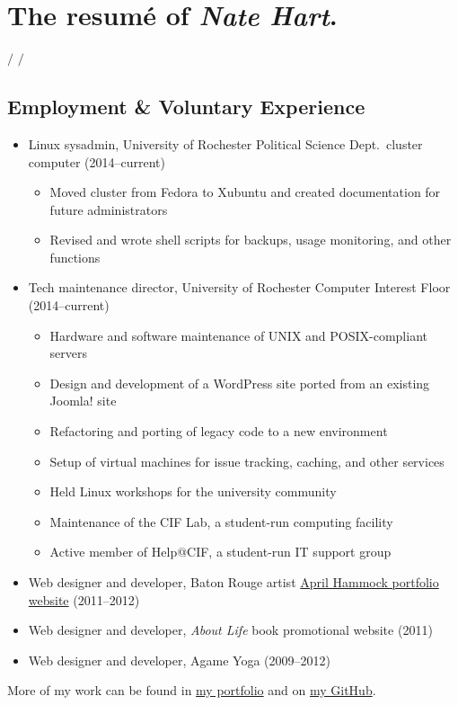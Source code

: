 \documentclass[10pt]{article}
\begin{document}
\section*{The resum\'{e} of \emph{Nate Hart}.}

 $/$
           $/$



\noindent\makebox[\linewidth]{\textcolor{secondarycolor}{\rule{\paperwidth}{0.4pt}}}



\subsection*{Employment \& Voluntary Experience}

\begin{itemize}
	\item Linux sysadmin, University of Rochester Political Science Dept.\ cluster computer (2014--current)
		\begin{itemize}
			\item Moved cluster from Fedora to Xubuntu and created documentation for future administrators
			\item Revised and wrote shell scripts for backups, usage monitoring, and other functions
		\end{itemize}
	\item Tech maintenance director, University of Rochester Computer Interest Floor (2014--current)
		\begin{itemize}
			\item Hardware and software maintenance of UNIX and POSIX-compliant servers
			\item Design and development of a WordPress site ported from an existing Joomla! site
			\item Refactoring and porting of legacy code to a new environment
			\item Setup of virtual machines for issue tracking, caching, and other services
			\item Held Linux workshops for the university community
			\item Maintenance of the CIF Lab, a student-run computing facility
			\item Active member of Help@CIF, a student-run IT support group
		\end{itemize}
	\item Web designer and developer, Baton Rouge artist \href{http://aprilhammockstudio.com}{April Hammock portfolio website} (2011--2012)
	\item Web designer and developer, \textit{About Life} book promotional website (2011)
	\item Web designer and developer, Agame Yoga (2009--2012)
\end{itemize}
\vspace{-0.75em}
More of my work can be found in \href{http://iamnatehart.com}{my portfolio} and on \href{https://github.com/nejsan}{my GitHub}.
\end{document}
